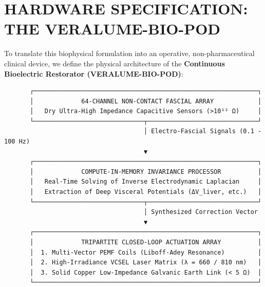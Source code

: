 \documentclass[10pt,twocolumn]{article}
\begin{document}
\section{HARDWARE SPECIFICATION: THE VERALUME-BIO-POD}

To translate this biophysical formulation into an operative, non-pharmaceutical clinical device, we define the physical architecture of the \textbf{Continuous Bioelectric Restorator (VERALUME-BIO-POD)}:

\begin{verbatim}
       ┌─────────────────────────────────────────────────────────────┐
       │             64-CHANNEL NON-CONTACT FASCIAL ARRAY            │
       │   Dry Ultra-High Impedance Capacitive Sensors (>10¹² Ω)     │
       └──────────────────────────────┬──────────────────────────────┘
                                      │ Electro-Fascial Signals (0.1 - 100 Hz)
                                      ▼
       ┌─────────────────────────────────────────────────────────────┐
       │             COMPUTE-IN-MEMORY INVARIANCE PROCESSOR          │
       │   Real-Time Solving of Inverse Electrodynamic Laplacian     │
       │   Extraction of Deep Visceral Potentials (ΔV_liver, etc.)   │
       └──────────────────────────────┬──────────────────────────────┘
                                      │ Synthesized Correction Vector
                                      ▼
       ┌─────────────────────────────────────────────────────────────┐
       │             TRIPARTITE CLOSED-LOOP ACTUATION ARRAY          │
       │  1. Multi-Vector PEMF Coils (Liboff-Adey Resonance)         │
       │  2. High-Irradiance VCSEL Laser Matrix (λ = 660 / 810 nm)   │
       │  3. Solid Copper Low-Impedance Galvanic Earth Link (< 5 Ω)  │
       └─────────────────────────────────────────────────────────────┘
\end{verbatim}
\end{document}
